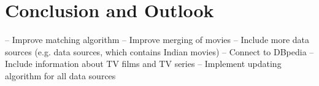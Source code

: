 \section{Conclusion and Outlook}
\label{sec_conclusion}

– Improve matching algorithm
– Improve merging of movies
– Include more data sources
    (e.g. data sources, which contains Indian movies)
– Connect to DBpedia
– Include information about TV films and TV series
– Implement updating algorithm for all data sources